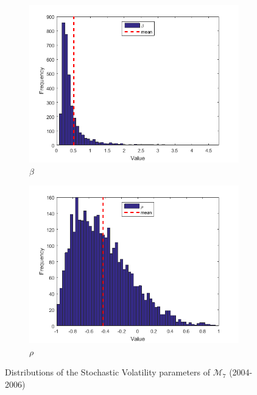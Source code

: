 \documentclass[11pt,a4,twosided,singlespacing,titlepagenumber=on]{scrreprt}
\numberwithin{equation}{chapter} %
\theoremstyle{remark}
\begin{document}
\begin{figure}[H]
\begin{subfigure}[t]{0.32\textwidth}
        \includegraphics[width=1\textwidth]{res/params/5114_5845/5}
        \caption{$\beta$}
    \end{subfigure}
    \begin{subfigure}[t]{0.32\textwidth}
        \centering
        \includegraphics[width=1\textwidth]{res/params/5114_5845/6}
        \caption{$\rho$}
    \end{subfigure}
    \caption[]{Distributions of the Stochastic Volatility parameters of $\mathcal{M}_7$ (2004-2006)}
    \label{fig:param_dists_2000_2002}
\end{figure}
\end{document}
